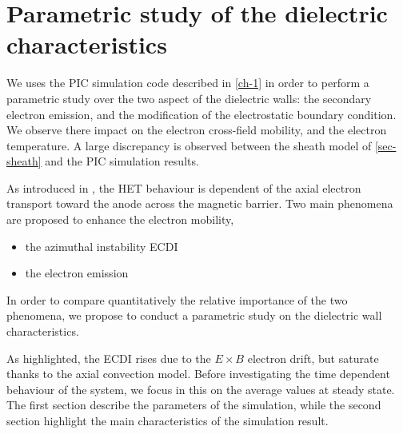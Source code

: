 



\chapter{Parametric study of the dielectric characteristics}
\label{ch-2}

We uses the PIC simulation code described in \cref{ch-1} in order to perform a parametric study over the two aspect of the dielectric walls: the secondary electron emission, and the modification of the electrostatic boundary condition.
We observe there impact on the electron cross-field mobility, and the electron temperature.
A large discrepancy is observed between the sheath model of \cref{sec-sheath} and the PIC simulation results.

\minitoc


% 
% 
% 
% 
% 
% 
% 

As introduced in , the \ac{HET} behaviour is dependent of the axial electron transport toward the anode across the magnetic barrier.
Two main phenomena are proposed to enhance the electron mobility,
\begin{itemize}
  \item the azimuthal instability \ac{ECDI}
  \item the electron emission
\end{itemize}
In order to compare quantitatively the relative importance of the two phenomena, we propose to conduct a parametric study on the dielectric wall characteristics.

As highlighted, the \ac{ECDI} rises due to the $E \times B$ electron drift, but saturate thanks to the axial convection model.
Before investigating the time dependent behaviour of the system, we focus in this  on the average values at steady state.
The first section describe the parameters of the simulation, 
while the second section highlight the main characteristics of the simulation result.









